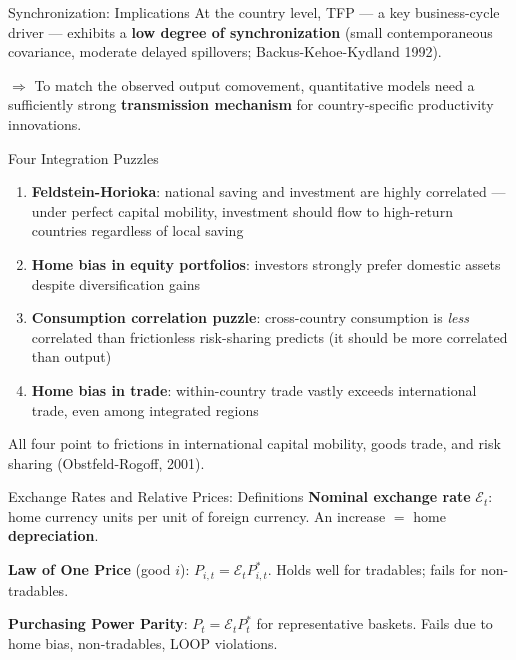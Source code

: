 \documentclass[blue]{beamer}
\begin{document}
\begin{frame}{Synchronization: Implications}
At the country level, TFP --- a key business-cycle driver --- exhibits a \textbf{low degree of synchronization} (small contemporaneous covariance, moderate delayed spillovers; Backus-Kehoe-Kydland 1992).

\bigskip
$\Rightarrow$ To match the observed output comovement, quantitative models need a sufficiently strong \textbf{transmission mechanism} for country-specific productivity innovations.
\end{frame}

\begin{frame}{Four Integration Puzzles}
\begin{enumerate}
    \item \textbf{Feldstein-Horioka}: national saving and investment are highly correlated --- under perfect capital mobility, investment should flow to high-return countries regardless of local saving

    \item \textbf{Home bias in equity portfolios}: investors strongly prefer domestic assets despite diversification gains

    \item \textbf{Consumption correlation puzzle}: cross-country consumption is \emph{less} correlated than frictionless risk-sharing predicts (it should be more correlated than output)

    \item \textbf{Home bias in trade}: within-country trade vastly exceeds international trade, even among integrated regions
\end{enumerate}

\bigskip
All four point to frictions in international capital mobility, goods trade, and risk sharing (Obstfeld-Rogoff, 2001).
\end{frame}

\begin{frame}{Exchange Rates and Relative Prices: Definitions}
\textbf{Nominal exchange rate} $\mathcal{E}_t$: home currency units per unit of foreign currency. An increase $=$ home \textbf{depreciation}.

\bigskip
\textbf{Law of One Price} (good $i$): $P_{i,t} = \mathcal{E}_t P^*_{i,t}$. Holds well for tradables; fails for non-tradables.

\textbf{Purchasing Power Parity}: $P_t = \mathcal{E}_t P_t^*$ for representative baskets. Fails due to home bias, non-tradables, LOOP violations.

\end{frame}
\end{document}
